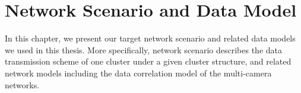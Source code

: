 \section{Network Scenario and Data Model}
\label{sec::scenarioAndModel}
In this chapter, we present our target network scenario and related data models we used in this thesis.
More specifically, network scenario describes the data transmission scheme of one cluster under a given cluster structure, and related network models including the data correlation model of the multi-camera networks.

